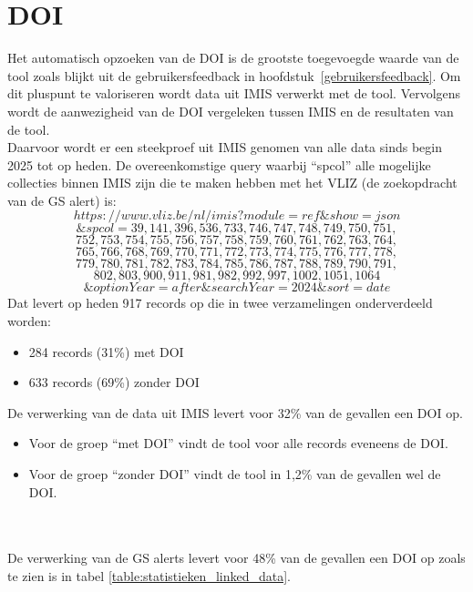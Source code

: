 \section{DOI}
\label{discussiedoi}
Het automatisch opzoeken van de DOI is de grootste toegevoegde waarde van de tool zoals blijkt uit de gebruikersfeedback in hoofdstuk~\ref{gebruikersfeedback}. Om dit pluspunt te valoriseren wordt data uit IMIS verwerkt met de tool. Vervolgens wordt de aanwezigheid van de DOI vergeleken tussen IMIS en de resultaten van de tool.\\
Daarvoor wordt er een steekproef uit IMIS genomen van alle data sinds begin 2025 tot op heden.
De overeenkomstige query waarbij ``spcol'' alle mogelijke collecties binnen IMIS zijn die te maken hebben met het VLIZ (de zoekopdracht van de GS alert) is:
\[https://www.vliz.be/nl/imis?module=ref\&show=json\]
\[\&spcol=39,141,396,536,733,746,747,748,749,750,751,\]
\[752,753,754,755,756,757,758,759,760,761,762,763,764,\]
\[765,766,768,769,770,771,772,773,774,775,776,777,778,\]
\[779,780,781,782,783,784,785,786,787,788,789,790,791,\]
\[802,803,900,911,981,982,992,997,1002,1051,1064\]
\[\&optionYear=after\&searchYear=2024\&sort=date\]
Dat levert op heden 917 records op die in twee verzamelingen onderverdeeld worden:
\begin{itemize}
    \item 284 records (31\%) met DOI
    \item 633 records (69\%) zonder DOI
\end{itemize}
De verwerking van de data uit IMIS levert voor 32\% van de gevallen een DOI op.
\begin{itemize}
    \item Voor de groep ``met DOI'' vindt de tool voor alle records eveneens de DOI.
    \item Voor de groep ``zonder DOI'' vindt de tool in 1,2\% van de gevallen wel de DOI.
\end{itemize}
\\\\
De verwerking van de GS alerts levert voor 48\% van de gevallen een DOI op zoals te zien is in tabel \ref{table:statistieken_linked_data}.
